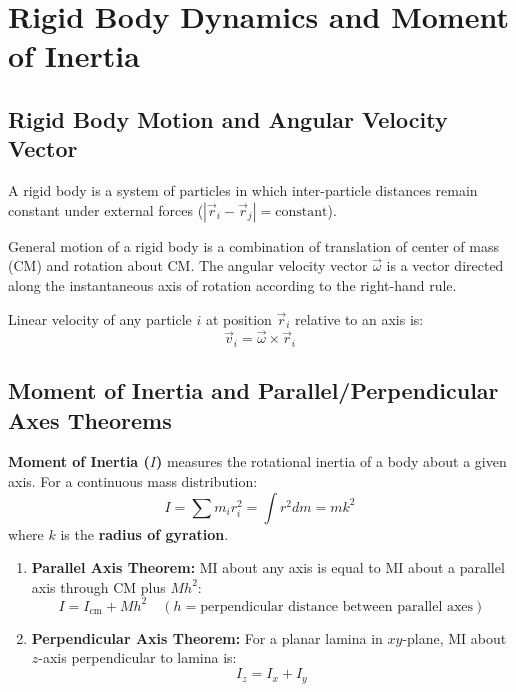 \documentclass[12pt,a4paper]{article}
\begin{document}
\section{Rigid Body Dynamics and Moment of Inertia}

\subsection{Rigid Body Motion and Angular Velocity Vector}

A rigid body is a system of particles in which inter-particle distances remain constant under external forces ($|\vec{r}_i - \vec{r}_j| = \text{constant}$).

General motion of a rigid body is a combination of translation of center of mass (CM) and rotation about CM. The angular velocity vector $\vec{\omega}$ is a vector directed along the instantaneous axis of rotation according to the right-hand rule.

Linear velocity of any particle $i$ at position $\vec{r}_i$ relative to an axis is:
\begin{equation}
\vec{v}_i = \vec{\omega} \times \vec{r}_i
\end{equation}

\subsection{Moment of Inertia and Parallel/Perpendicular Axes Theorems}

\begin{tcolorbox}[defbox, title={\textbf{Definition: Moment of Inertia}}]
\textbf{Moment of Inertia ($I$)} measures the rotational inertia of a body about a given axis. For a continuous mass distribution:
\begin{equation}
I = \sum m_i r_i^2 = \int r^2 dm = m k^2
\end{equation}
where $k$ is the \textbf{radius of gyration}.
\end{tcolorbox}

\begin{tcolorbox}[formulabox, title={\textbf{Fundamental Theorems of Moment of Inertia}}]
\begin{enumerate}[leftmargin=*, itemsep=4pt]
  \item \textbf{Parallel Axis Theorem:} MI about any axis is equal to MI about a parallel axis through CM plus $M h^2$:
  \begin{equation}
  I = I_{\text{cm}} + M h^2 \quad (h = \text{perpendicular distance between parallel axes})
  \end{equation}
  \item \textbf{Perpendicular Axis Theorem:} For a planar lamina in $xy$-plane, MI about $z$-axis perpendicular to lamina is:
  \begin{equation}
  I_z = I_x + I_y
  \end{equation}
\end{enumerate}
\end{tcolorbox}
\end{document}
